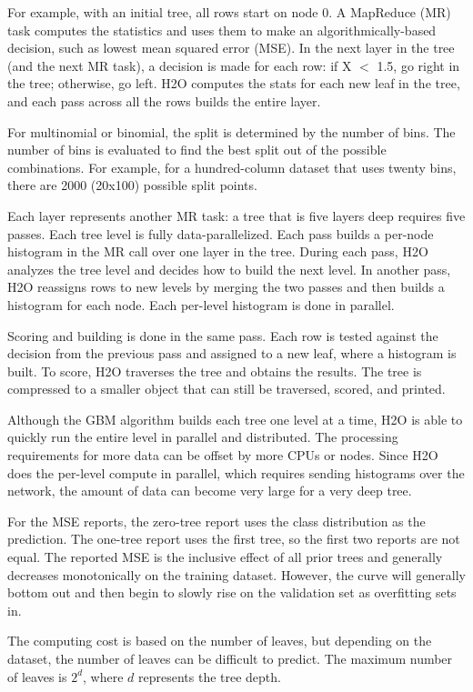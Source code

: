 For example, with an initial tree, all rows start on node 0. A MapReduce (MR) task computes the statistics and uses
them to make an algorithmically-based decision, such as lowest mean squared error (MSE). In the next layer in the
tree (and the next MR task), a decision is made for each row: if X $<$ 1.5, go right in the tree; otherwise, go left.
H2O computes the stats for each new leaf in the tree, and each pass across all the rows builds the entire layer.

For multinomial or binomial, the split is determined by the number of bins. The number of bins is evaluated to
find the best split out of the possible combinations. For example, for a hundred-column dataset that uses twenty bins,
there are 2000 (20x100) possible split points.

Each layer represents another MR task: a tree that is five layers deep requires five passes. Each tree
level is fully data-parallelized. Each pass  builds a per-node histogram in the MR call over one layer in the tree.  During each pass, H2O analyzes the tree level and decides how to build the next level. In another pass, H2O reassigns rows to new levels by merging the two passes and then builds a histogram for each node. Each per-level histogram is done in parallel.

Scoring and building is done in the same pass. Each row is tested against the decision from the previous pass and assigned
to a new leaf, where a histogram is built. To score, H2O traverses the tree and obtains the results. The
tree is compressed to a smaller object that can still be traversed, scored, and printed.

Although the GBM algorithm builds each tree one level at a time, H2O is able to quickly run the entire level in
parallel and distributed. The processing requirements for more data can be offset by more CPUs or nodes.
Since H2O does the per-level compute in parallel, which requires sending histograms over the network, the amount
of data can become very large for a very deep tree.


For the MSE reports, the zero-tree report uses the class distribution as the prediction. The one-tree report
uses the first tree, so the first two reports are not equal. The reported MSE is the inclusive effect of all
prior trees and generally decreases monotonically on the training dataset. However, the curve will generally
bottom out and then begin to slowly rise on the validation set as overfitting sets in.

The computing cost is based on the number of leaves, but depending on the dataset, the number of leaves can be
difficult to predict. The maximum number of leaves is $2^d$, where $d$ represents the tree depth.

